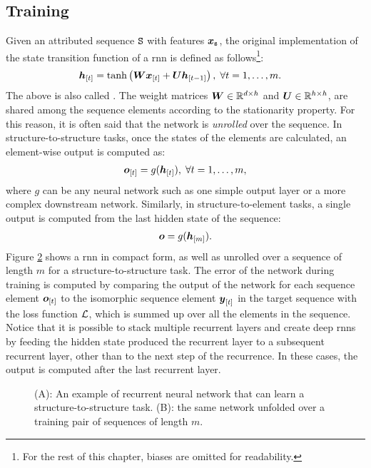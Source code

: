 \subsection{Training}
Given an attributed sequence $\mathtt{S}$ with features $\Vector{x}_{\Seq{s}}$, the original implementation of the state transition function of a \gls{rnn} is defined as follows\footnote{For the rest of this chapter, biases are omitted for readability.}:
\begin{align*}
    \Elem{h}{t} &= \tanh\Par{\Matrix{W}\Elem{x}{t} + \Matrix{U}\Elem{h}{t-1}},\; \forall t=1, \ldots, m.
\end{align*}
The above is also called . The weight matrices $\Matrix{W} \in \Real^{d \times h}$ and $\Matrix{U} \in \Real^{h \times h}$, are shared among the sequence elements according to the stationarity property. For this reason, it is often said that the network is \emph{unrolled} over the sequence. In structure-to-structure tasks, once the states of the elements are calculated, an element-wise output is computed as:
\begin{align*}
    \Elem{o}{t} = g(\Elem{h}{t}),\; \forall t=1, \ldots, m,
\end{align*}
where $g$ can be any neural network such as one simple output layer or a more complex downstream network. Similarly, in structure-to-element tasks, a single output is computed from the last hidden state of the sequence:
\begin{align*}
    \Vector{o} = g(\Elem{h}{m}).
\end{align*}
Figure \ref{fig:rnn-unfold} shows a \gls{rnn} in compact form, as well as unrolled over a sequence of length $m$ for a structure-to-structure task. The error of the network during training is computed by comparing the output of the network for each sequence element $\Elem{o}{t}$ to the isomorphic sequence element $\Elem{y}{t}$ in the target sequence with the loss function $\mathcal{L}$, which is summed up over all the elements in the sequence. Notice that it is possible to stack multiple recurrent layers and create deep \glspl{rnn} by feeding the hidden state produced the recurrent layer to a subsequent recurrent layer, other than to the next step of the recurrence. In these cases, the output is computed after the last recurrent layer.
\begin{figure*}[h!]
    \begin{subfigure}[b]{0.39\linewidth}
        \centering
        \resizebox{.7\textwidth}{!}{}
        \caption{}
        \label{fig:rnn}
    \end{subfigure}
    \begin{subfigure}[b]{0.59\linewidth}
        \centering
        \resizebox{.8\textwidth}{!}{}
        \caption{}
        \label{fig:rnn-unfold}
    \end{subfigure}
    \caption{({\scriptsize A}): An example of recurrent neural network that can learn a structure-to-structure task. ({\scriptsize B}): the same network unfolded over a training pair of sequences of length $m$.}
    \label{fig:rnn-example}
\end{figure*}
